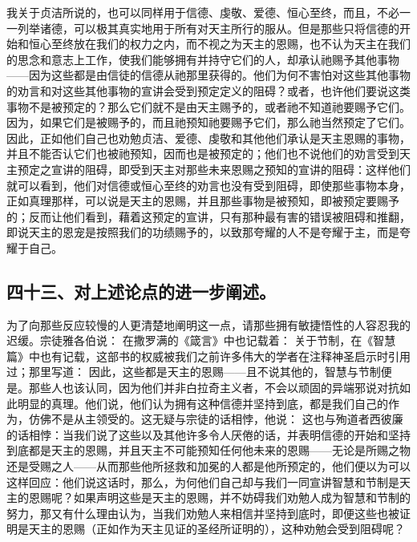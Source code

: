 我关于贞洁所说的，也可以同样用于信德、虔敬、爱德、恒心至终，而且，不必一一列举诸德，可以极其真实地用于所有对天主所行的服从。但是那些只将信德的开始和恒心至终放在我们的权力之内，而不视之为天主的恩赐，也不认为天主在我们的思念和意志上工作，使我们能够拥有并持守它们的人，却承认祂赐予其他事物——因为这些都是由信徒的信德从祂那里获得的。他们为何不害怕对这些其他事物的劝言和对这些其他事物的宣讲会受到预定定义的阻碍？或者，也许他们要说这类事物不是被预定的？那么它们就不是由天主赐予的，或者祂不知道祂要赐予它们。因为，如果它们是被赐予的，而且祂预知祂要赐予它们，那么祂当然预定了它们。因此，正如他们自己也劝勉贞洁、爱德、虔敬和其他他们承认是天主恩赐的事物，并且不能否认它们也被祂预知，因而也是被预定的；他们也不说他们的劝言受到天主预定之宣讲的阻碍，即受到天主对那些未来恩赐之预知的宣讲的阻碍：这样他们就可以看到，他们对信德或恒心至终的劝言也没有受到阻碍，即使那些事物本身，正如真理那样，可以说是天主的恩赐，并且那些事物是被预知，即被预定要赐予的；反而让他们看到，藉着这预定的宣讲，只有那种最有害的错误被阻碍和推翻，即说天主的恩宠是按照我们的功绩赐予的，以致那夸耀的人不是夸耀于主，而是夸耀于自己。\par


\subsection{四十三、对上述论点的进一步阐述。}

为了向那些反应较慢的人更清楚地阐明这一点，请那些拥有敏捷悟性的人容忍我的迟缓。宗徒雅各伯说： 在撒罗满的《箴言》中也记载着： 关于节制，在《智慧篇》中也有记载，这部书的权威被我们之前许多伟大的学者在注释神圣启示时引用过；那里写道： 因此，这些都是天主的恩赐——且不说其他的，智慧与节制便是。那些人也该认同，因为他们并非白拉奇主义者，不会以顽固的异端邪说对抗如此明显的真理。他们说，他们认为拥有这种信德并坚持到底，都是我们自己的作为，仿佛不是从主领受的。这无疑与宗徒的话相悖，他说： 这也与殉道者西彼廉的话相悖：当我们说了这些以及其他许多令人厌倦的话，并表明信德的开始和坚持到底都是天主的恩赐，并且天主不可能预知任何他未来的恩赐——无论是所赐之物还是受赐之人——从而那些他所拯救和加冕的人都是他所预定的，他们便以为可以这样回应：他们说这话时，那么，为何他们自己却与我们一同宣讲智慧和节制是天主的恩赐呢？如果声明这些是天主的恩赐，并不妨碍我们劝勉人成为智慧和节制的努力，那又有什么理由认为，当我们劝勉人来相信并坚持到底时，即便这些也被证明是天主的恩赐（正如作为天主见证的圣经所证明的），这种劝勉会受到阻碍呢？\par


